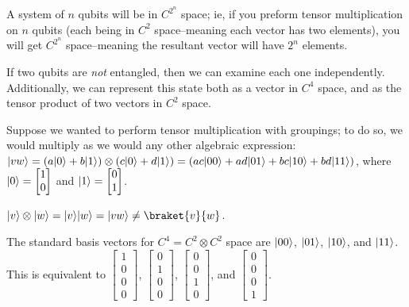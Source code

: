 
\begin{note}
    A system of $n$ qubits will be in $C^{2^n}$ space; ie, if you preform tensor multiplication on $n$ qubits (each being in $C^2$ space--meaning each vector has two elements), you will get $C^{2^n}$ space--meaning the resultant vector will have $2^n$ elements.
\end{note}

\begin{note}
    If two qubits are \emph{not} entangled, then we can examine each one independently. Additionally, we can represent this state both as a vector in $C^4$ space, and as the tensor product of two vectors in $C^2$ space.
\end{note}

Suppose we wanted to perform tensor multiplication with groupings; to do so, we would multiply as we would any other algebraic expression: $\lvert vw\rangle = (a \lvert0\rangle + b \lvert1\rangle) \otimes (c \lvert0\rangle + d \lvert1\rangle) = (ac \lvert00\rangle + ad \lvert01\rangle + bc \lvert10\rangle + bd \lvert11\rangle)$, where $\lvert0\rangle = \begin{bmatrix}
    1\\
    0
\end{bmatrix}$ and $\lvert1\rangle = \begin{bmatrix}
    0\\
    1
\end{bmatrix}$.

\begin{note}
    $\ket{v} \otimes \ket{w} = \ket{v} \ket{w} = \ket{vw} \neq \braket{v}{w}$.
\end{note}

The standard basis vectors for $C^4 = C^2 \otimes C^2$ space are $\lvert00\rangle$, $\lvert01\rangle$, $\lvert10\rangle$, and $\lvert11\rangle$. This is equivalent to $\begin{bmatrix}
    1\\
    0\\
    0\\
    0
\end{bmatrix}$, $\begin{bmatrix}
    0\\
    1\\
    0\\
    0
\end{bmatrix}$, $\begin{bmatrix}
    0\\
    0\\
    1\\
    0
\end{bmatrix}$, and $\begin{bmatrix}
    0\\
    0\\
    0\\
    1
\end{bmatrix}$.

